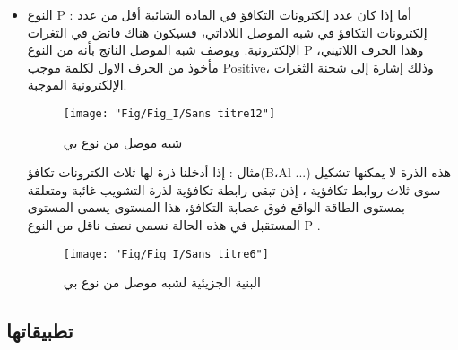 \begin{enumerate}
\begin{itemize}
		\item 
		النوع P : أما إذا كان عدد إلكترونات التكافؤ في المادة الشائبة أقل من عدد إلكترونات التكافؤ في شبه الموصل اللاذاتي، فسيكون هناك فائض في الثغرات الإلكترونية. ويوصف شبه الموصل الناتج بأنه من النوع P ،وهذا الحرف اللاتيني مأخوذ من الحرف الاول لكلمة موجب Positive، وذلك إشارة إلى شحنة الثغرات الإلكترونية الموجبة.
		
		\begin{figure}[bh]
			\centering
			\texttt{[image: "Fig/Fig\_I/Sans titre12"]}
			\caption{ شبه موصل من نوع بي}
			\label{fig:sans-titre12}
		\end{figure}
		\FloatBarrier
		
		مثال : إذا أدخلنا ذرة لها ثلاث الكترونات تكافؤ(B،Al ...) هذه الذرة لا يمكنها تشكيل سوى ثلاث روابط تكافؤية ، إذن تبقى رابطة تكافؤية لذرة التشويب غائبة ومتعلقة بمستوى الطاقة الواقع فوق عصابة التكافؤ، هذا المستوى يسمى المستوى المستقبل في هذه الحالة نسمى نصف ناقل من النوع P .
		\begin{figure*}[h!]
			\centering
			\texttt{[image: "Fig/Fig\_I/Sans titre6"]}
			\caption{البنية الجزيئية لشبه موصل من نوع بي}
			\label{fig:sans-titre6}
		\end{figure*}
		\FloatBarrier
		
	\end{itemize}
	
\end{enumerate}

\subsection{ تطبيقاتها}

